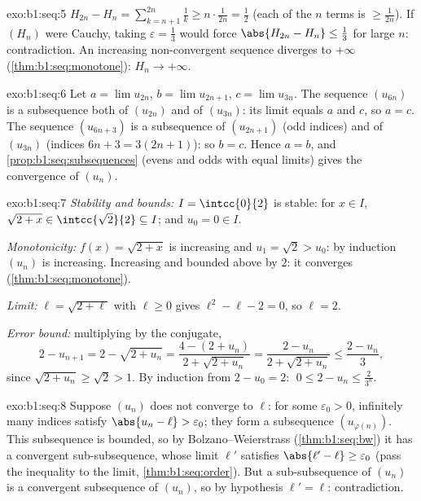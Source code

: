 \begin{solution}{exo:b1:seq:5}
$H_{2n} - H_n = \sum_{k=n+1}^{2n} \frac 1k \geq n \cdot
\frac{1}{2n} = \frac12$ (each of the $n$ terms is $\geq
\frac{1}{2n}$). If $(H_n)$ were Cauchy, taking $\varepsilon =
\frac13$ would force $\abs{H_{2n} - H_n} \leq \frac13$ for large
$n$: contradiction. An increasing non-convergent sequence diverges to
$+\infty$ (\cref{thm:b1:seq:monotone}): $H_n \to +\infty$.
\end{solution}

\begin{solution}{exo:b1:seq:6}
Let $a = \lim u_{2n}$, $b = \lim u_{2n+1}$, $c = \lim u_{3n}$. The
sequence $(u_{6n})$ is a subsequence both of $(u_{2n})$ and of
$(u_{3n})$: its limit equals $a$ and $c$, so $a = c$. The sequence
$(u_{6n+3})$ is a subsequence of $(u_{2n+1})$ (odd indices) and of
$(u_{3n})$ (indices $6n + 3 = 3(2n+1)$): so $b = c$. Hence $a = b$,
and \cref{prop:b1:seq:subsequences} (evens and odds with equal
limits) gives the convergence of $(u_n)$.
\end{solution}

\begin{solution}{exo:b1:seq:7}
\emph{Stability and bounds:} $I = \intcc{0}{2}$ is stable: for $x \in
I$, $\sqrt{2 + x} \in \intcc{\sqrt 2}{2} \subseteq I$; and $u_0 = 0
\in I$.

\emph{Monotonicity:} $f(x) = \sqrt{2+x}$ is increasing and $u_1 =
\sqrt 2 > u_0$: by induction $(u_n)$ is increasing. Increasing and
bounded above by $2$: it converges
(\cref{thm:b1:seq:monotone}).

\emph{Limit:} $\ell = \sqrt{2 + \ell}$ with $\ell \geq 0$ gives
$\ell^2 - \ell - 2 = 0$, so $\ell = 2$.

\emph{Error bound:} multiplying by the conjugate,
\[
2 - u_{n+1} = 2 - \sqrt{2 + u_n}
= \frac{4 - (2 + u_n)}{2 + \sqrt{2+u_n}}
= \frac{2 - u_n}{2 + \sqrt{2 + u_n}}
\leq \frac{2 - u_n}{3},
\]
since $\sqrt{2 + u_n} \geq \sqrt 2 > 1$. By induction from $2 - u_0
= 2$: $\;0 \leq 2 - u_n \leq \frac{2}{3^n}$.
\end{solution}

\begin{solution}{exo:b1:seq:8}
Suppose $(u_n)$ does not converge to $\ell$: for some $\varepsilon_0
> 0$, infinitely many indices satisfy $\abs{u_n - \ell} >
\varepsilon_0$; they form a subsequence $(u_{\varphi(n)})$. This
subsequence is bounded, so by Bolzano--Weierstrass
(\cref{thm:b1:seq:bw}) it has a convergent sub-subsequence, whose
limit $\ell'$ satisfies $\abs{\ell' - \ell} \geq \varepsilon_0$
(pass the inequality to the limit, \cref{thm:b1:seq:order}). But a
sub-subsequence of $(u_n)$ is a convergent subsequence of $(u_n)$,
so by hypothesis $\ell' = \ell$: contradiction.
\end{solution}


